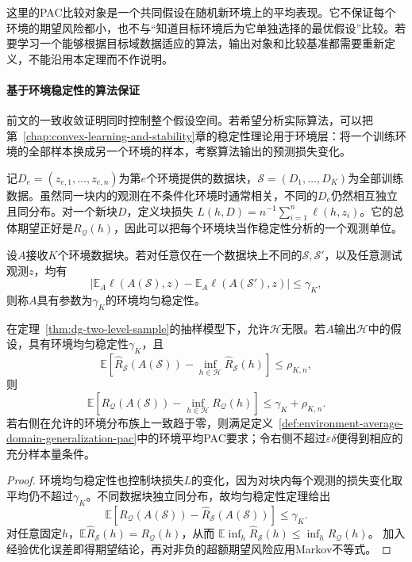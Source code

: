 这里的PAC比较对象是一个共同假设在随机新环境上的平均表现。它不保证每个环境的期望风险都小，也不与“知道目标环境后为它单独选择的最优假设”比较。若要学习一个能够根据目标域数据适应的算法，输出对象和比较基准都需要重新定义，不能沿用本定理而不作说明。

\paragraph{基于环境稳定性的算法保证}
\label{sec:dg-environment-stability}

前文的一致收敛证明同时控制整个假设空间。若希望分析实际算法，可以把第~\ref{chap:convex-learning-and-stability}章的稳定性理论用于环境层：将一个训练环境的全部样本换成另一个环境的样本，考察算法输出的预测损失变化。

记$D_e=(z_{e,1},\ldots,z_{e,n})$为第$e$个环境提供的数据块，$\mathcal S=(D_1,\ldots,D_K)$为全部训练数据。虽然同一块内的观测在不条件化环境时通常相关，不同的$D_e$仍然相互独立且同分布。对一个新块$D$，定义块损失
$L(h,D)=n^{-1}\sum_{i=1}^n\ell(h,z_i)$。它的总体期望正好是$R_{\mathcal Q}(h)$，因此可以把每个环境块当作稳定性分析的一个观测单位。

\begin{definition}[环境均匀稳定性]
\label{def:environment-stability}
设$A$接收$K$个环境数据块。若对任意仅在一个数据块上不同的$\mathcal S,\mathcal S'$，以及任意测试观测$z$，均有
\[
 \left|\mathbb E_A\ell(A(\mathcal S),z)
       -\mathbb E_A\ell(A(\mathcal S'),z)\right|\leq\gamma_K,
\]
则称$A$具有参数为$\gamma_K$的环境均匀稳定性。
\end{definition}

\begin{theorem}[环境稳定性与平均可学习性]
\label{thm:dg-environment-stability}
在定理~\ref{thm:dg-two-level-sample}的抽样模型下，允许$\mathcal H$无限。若$A$输出$\mathcal H$中的假设，具有环境均匀稳定性$\gamma_K$，且
\[
 \mathbb E\!\left[\widehat R_{\mathcal S}(A(\mathcal S))-
                  \inf_{h\in\mathcal H}\widehat R_{\mathcal S}(h)\right]\leq\rho_{K,n},
\]
则
\[
 \mathbb E\!\left[R_{\mathcal Q}(A(\mathcal S))-
                  \inf_{h\in\mathcal H}R_{\mathcal Q}(h)\right]
 \leq\gamma_K+\rho_{K,n}.
\]
若右侧在允许的环境分布族上一致趋于零，则满足定义~\ref{def:environment-average-domain-generalization-pac}中的环境平均PAC要求；令右侧不超过$\varepsilon\delta$便得到相应的充分样本量条件。
\end{theorem}
\begin{proof}
环境均匀稳定性也控制块损失$L$的变化，因为对块内每个观测的损失变化取平均仍不超过$\gamma_K$。不同数据块独立同分布，故均匀稳定性定理给出
\[
 \mathbb E[R_{\mathcal Q}(A(\mathcal S))-\widehat R_{\mathcal S}(A(\mathcal S))]\leq\gamma_K.
\]
对任意固定$h$，$\mathbb E\widehat R_{\mathcal S}(h)=R_{\mathcal Q}(h)$，从而
$\mathbb E\inf_h\widehat R_{\mathcal S}(h)\leq\inf_hR_{\mathcal Q}(h)$。
加入经验优化误差即得期望结论，再对非负的超额期望风险应用Markov不等式。
\end{proof}

